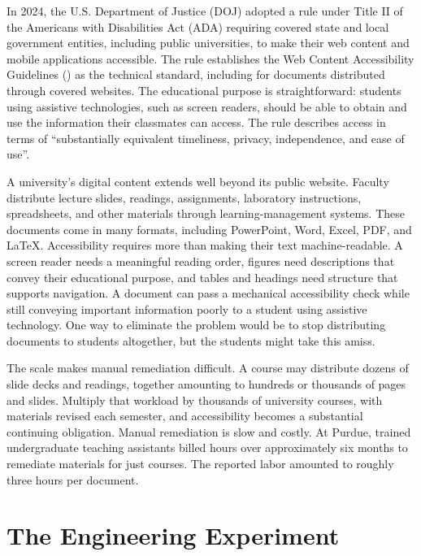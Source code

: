 In 2024, the U.S. Department of Justice (DOJ) adopted a rule under Title II of the Americans with Disabilities Act (ADA) requiring covered state and local government entities, including public universities, to make their web content and mobile applications accessible. The rule establishes the Web Content Accessibility Guidelines () as the technical standard, including for documents distributed through covered websites. The educational purpose is straightforward: students using assistive technologies, such as screen readers, should be able to obtain and use the information their classmates can access. The rule describes access in terms of ``substantially equivalent timeliness, privacy, independence, and ease of use''\citep{doj-web-accessibility-2024}.

A university's digital content extends well beyond its public website. Faculty distribute lecture slides, readings, assignments, laboratory instructions, spreadsheets, and other materials through learning-management systems. These documents come in many formats, including PowerPoint, Word, Excel, PDF, and LaTeX. Accessibility requires more than making their text machine-readable. A screen reader needs a meaningful reading order, figures need descriptions that convey their educational purpose, and tables and headings need structure that supports navigation\citep{w3c2018wcag21}. A document can pass a mechanical accessibility check while still conveying important information poorly to a student using assistive technology. One way to eliminate the problem would be to stop distributing documents to students altogether, but the students might take this amiss.

The scale makes manual remediation difficult. A course may distribute dozens of slide decks and readings, together amounting to hundreds or thousands of pages and slides. Multiply that workload by thousands of university courses, with materials revised each semester, and accessibility becomes a substantial continuing obligation. Manual remediation is slow and costly. At Purdue, trained undergraduate teaching assistants billed  hours over approximately six months to remediate materials for just  courses. The reported labor amounted to roughly three hours per document\citep{davis2026docable}.

\section{The Engineering Experiment}\label{heading:the-engineering-experiment}

